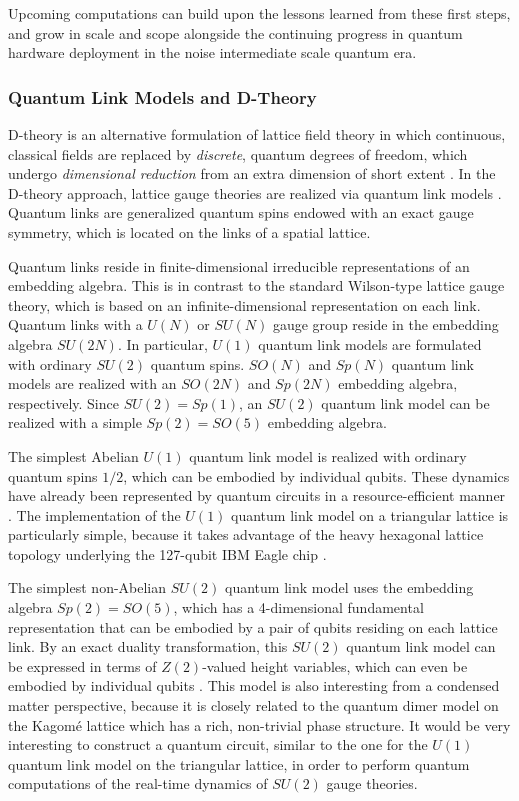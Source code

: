 Upcoming computations can build upon the lessons learned from these first steps, and grow in scale and scope alongside the continuing progress in quantum hardware deployment in the noise intermediate scale quantum era.

\subsubsection{Quantum Link Models and D-Theory}

D-theory is an alternative formulation of lattice field theory in which continuous, classical fields are replaced by {\em discrete}, quantum degrees of freedom, which undergo {\em dimensional reduction} from an extra dimension of short extent \cite{brower2004d}. In the D-theory approach, lattice gauge theories are realized via quantum link models
\cite{horn1981finite,orland1990lattice,chandrasekharan1997quantum,brower1999qcd,wiese2013ultracold,wiese2014towards}. Quantum links are generalized quantum spins endowed with an exact gauge symmetry, which is located on the links of a spatial lattice.

Quantum links reside in finite-dimensional irreducible representations of an embedding algebra. This is in contrast to the standard Wilson-type lattice gauge theory, which is based on an infinite-dimensional representation on each link. Quantum links with a $U(N)$ or $SU(N)$ gauge group reside in the embedding algebra $SU(2N)$. In particular, $U(1)$ quantum link models are formulated with ordinary $SU(2)$ quantum spins. $SO(N)$ and $Sp(N)$ quantum link models are realized with an $SO(2N)$ and $Sp(2N)$ embedding algebra, respectively. Since $SU(2) = Sp(1)$, an $SU(2)$ quantum link model can be realized with a simple $Sp(2) = SO(5)$ embedding algebra.
 
The simplest Abelian $U(1)$ quantum link model is realized with ordinary quantum spins $1/2$, which can be embodied by individual qubits. These dynamics have already been represented by quantum circuits in a resource-efficient manner \cite{wiese2022quantum}. The implementation of the $U(1)$ quantum link model on a triangular lattice is particularly simple, because it takes advantage of the heavy hexagonal lattice topology underlying the 127-qubit IBM Eagle chip \cite{banerjee2022nematic}. 

The simplest non-Abelian $SU(2)$ quantum link model uses the embedding algebra $Sp(2) = SO(5)$, which has a 4-dimensional fundamental representation that can be embodied by a pair of qubits residing on each lattice link. By an exact duality transformation, this $SU(2)$ quantum link model can be expressed in terms of $Z(2)$-valued height variables, which can even be embodied by individual qubits \cite{banerjee2018s}. This model is also interesting from a condensed matter perspective, because it is closely related to the quantum dimer model on the Kagom\'e lattice which has a rich, non-trivial phase structure. It would be very interesting to construct a quantum circuit, similar to the one for the $U(1)$ quantum link model on the triangular lattice, in order to perform quantum computations of the real-time dynamics of $SU(2)$ gauge theories.

